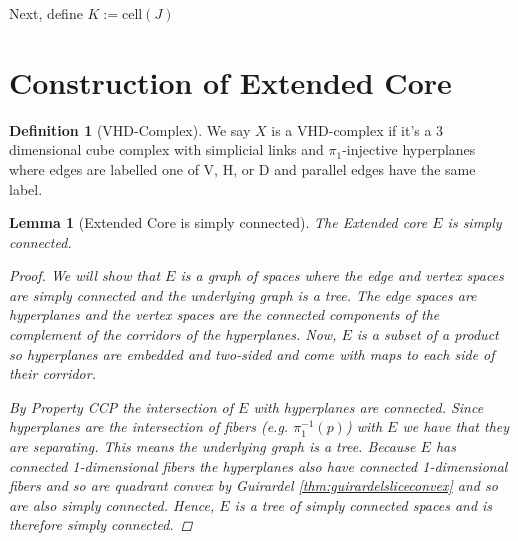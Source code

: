 \documentclass[12pt,parskip=full]{report}
\theoremstyle{plain}
\newtheorem{lem}[thm]{Lemma}
\theoremstyle{definition}
\newtheorem{dfn}[thm]{Definition}
\begin{document}
        
        
        
        Next, define \(K := \text{cell}(J)\) 

\section{Construction of Extended Core}

\begin{dfn}
    [VHD-Complex]
    We say \(X\) is a VHD-complex if it's a 3 dimensional cube complex with simplicial links and \(\pi_1\)-injective hyperplanes where edges are labelled one of V, H, or D and parallel edges have the same label.
\end{dfn}

\begin{lem}
    [Extended Core is simply connected]
    \label{lem:coresc} 
    The Extended core $E$ is simply connected.
    
    \begin{proof}
    
        
    
        We will show that $E$ is a graph of spaces where the edge and vertex spaces are simply connected and the underlying graph is a tree. The edge spaces are hyperplanes and the vertex spaces are the connected components of the complement of the corridors of the hyperplanes. Now, $E$ is a subset of a product so hyperplanes are embedded and two-sided and come with maps to each side of their corridor. 
        
        By Property CCP the intersection of $E$ with hyperplanes are connected. Since hyperplanes are the intersection of fibers (e.g. $\pi_1^{-1}(p)$) with $E$ we have that they are separating. This means the underlying graph is a tree. Because $E$ has connected 1-dimensional fibers the hyperplanes also have connected 1-dimensional fibers and so are quadrant convex by Guirardel \ref{thm:guirardelsliceconvex} and so are also simply connected. Hence, $E$ is a tree of simply connected spaces and is therefore simply connected.
        

\end{proof}
\end{lem}
\end{document}
